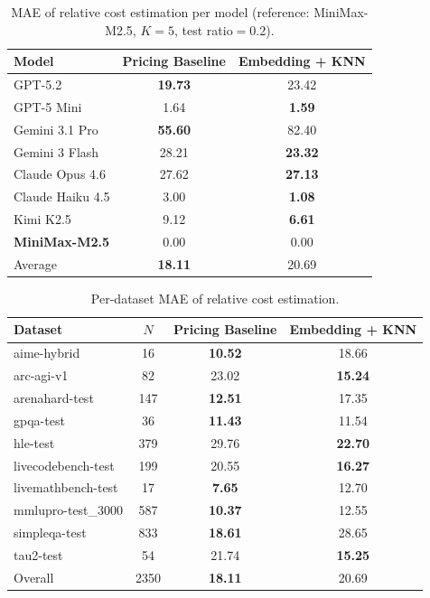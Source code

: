 \begin{table}[t]
\centering
\caption{MAE of relative cost estimation per model (reference: MiniMax-M2.5, $K{=}5$, test ratio$=$0.2).}
\label{tab:relative-cost-mae}
\begin{tabular}{lcc}
\toprule
Model & Pricing Baseline & Embedding + KNN \\
\midrule
GPT-5.2 & \textbf{19.73} & 23.42 \\
GPT-5 Mini & 1.64 & \textbf{1.59} \\
Gemini 3.1 Pro & \textbf{55.60} & 82.40 \\
Gemini 3 Flash & 28.21 & \textbf{23.32} \\
Claude Opus 4.6 & 27.62 & \textbf{27.13} \\
Claude Haiku 4.5 & 3.00 & \textbf{1.08} \\
Kimi K2.5 & 9.12 & \textbf{6.61} \\
\textbf{MiniMax-M2.5} & 0.00 & 0.00 \\
\midrule
Average & \textbf{18.11} & 20.69 \\
\bottomrule
\end{tabular}
\end{table}

\begin{table}[t]
\centering
\caption{Per-dataset MAE of relative cost estimation.}
\label{tab:relative-cost-mae-dataset}
\begin{tabular}{lccc}
\toprule
Dataset & $N$ & Pricing Baseline & Embedding + KNN \\
\midrule
aime-hybrid & 16 & \textbf{10.52} & 18.66 \\
arc-agi-v1 & 82 & 23.02 & \textbf{15.24} \\
arenahard-test & 147 & \textbf{12.51} & 17.35 \\
gpqa-test & 36 & \textbf{11.43} & 11.54 \\
hle-test & 379 & 29.76 & \textbf{22.70} \\
livecodebench-test & 199 & 20.55 & \textbf{16.27} \\
livemathbench-test & 17 & \textbf{7.65} & 12.70 \\
mmlupro-test_3000 & 587 & \textbf{10.37} & 12.55 \\
simpleqa-test & 833 & \textbf{18.61} & 28.65 \\
tau2-test & 54 & 21.74 & \textbf{15.25} \\
\midrule
Overall & 2350 & \textbf{18.11} & 20.69 \\
\bottomrule
\end{tabular}
\end{table}